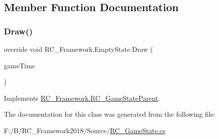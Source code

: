 \subsection{Member Function Documentation}
\mbox{\label{class_r_c___framework_1_1_empty_state_adfa60e364416dfe5f9a3ba565bc6329b}} 
\subsubsection{\texorpdfstring{Draw()}{Draw()}}
{\footnotesize\ttfamily override void R\+C\+\_\+\+Framework.\+Empty\+State.\+Draw (\begin{DoxyParamCaption}\item[{Game\+Time}]{game\+Time }\end{DoxyParamCaption})\hspace{0.3cm}{\ttfamily [virtual]}}



Implements \mbox{\hyperlink{class_r_c___framework_1_1_r_c___game_state_parent_adec421bc58a381ab34ffa74b495fa3c9}{R\+C\+\_\+\+Framework.\+R\+C\+\_\+\+Game\+State\+Parent}}.



The documentation for this class was generated from the following file\+:\begin{DoxyCompactItemize}
\item 
F\+:/\+B/\+R\+C\+\_\+\+Framework2018/\+Source/\mbox{\hyperlink{_r_c___game_state_8cs}{R\+C\+\_\+\+Game\+State.\+cs}}\end{DoxyCompactItemize}
